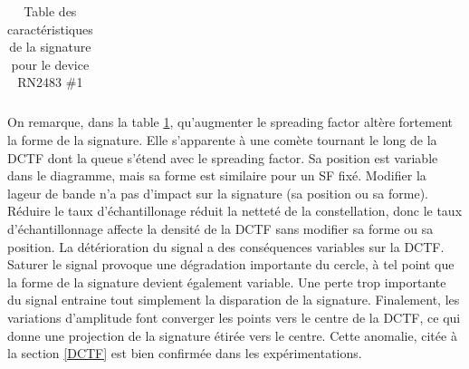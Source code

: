 \begin{table}[h]
\begin{tabular}{|c|c|c|c|c|}
\hline
\end{tabular}
\caption{Table des caractéristiques de la signature pour le device RN2483 \#1}
\label{signature1}
\end{table}

On remarque, dans la table \ref{signature1}, qu'augmenter le spreading factor altère fortement la forme de la signature. Elle s'apparente à une comète tournant le long de la \ac{DCTF} dont la queue s'étend avec le spreading factor. Sa position est variable dans le diagramme, mais sa forme est similaire pour un SF fixé. Modifier la lageur de bande n'a pas d'impact sur la signature (sa position ou sa forme). Réduire le taux d'échantillonage réduit la netteté de la constellation, donc le taux d'échantillonnage affecte la densité de la \ac{DCTF} sans modifier sa forme ou sa position. La détérioration du signal a des conséquences variables sur la \ac{DCTF}. Saturer le signal provoque une dégradation importante du cercle, à tel point que la forme de la signature devient également variable. Une perte trop importante du signal entraine tout simplement la disparation de la signature. Finalement, les variations d'amplitude font converger les points vers le centre de la \ac{DCTF}, ce qui donne une projection de la signature étirée vers le centre. Cette anomalie, citée à la section \ref{DCTF} est bien confirmée dans les expérimentations.

